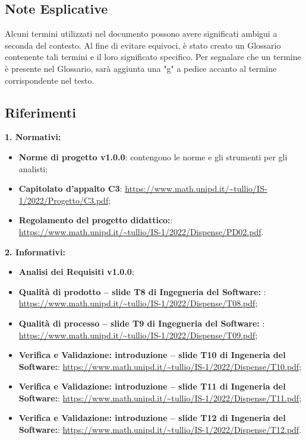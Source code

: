 \subsection{Note Esplicative}
Alcuni termini utilizzati nel documento possono avere significati ambigui a seconda del contesto. Al fine di evitare equivoci, è stato creato un Glossario contenente tali termini 
e il loro significato specifico. Per segnalare che un termine è presente nel Glossario, sarà aggiunta una "g" a pedice accanto al termine corrispondente nel testo.

\subsection{Riferimenti}
\textbf{1. Normativi:} 
\begin{itemize}
    \item \textbf{Norme di progetto v1.0.0}: contengono le norme e gli strumenti per gli analisti;
    \item \textbf{Capitolato d’appalto C3}: \url{https://www.math.unipd.it/~tullio/IS-1/2022/Progetto/C3.pdf};
    \item \textbf{Regolamento del progetto didattico:}: \url{https://www.math.unipd.it/~tullio/IS-1/2022/Dispense/PD02.pdf}.
\end{itemize}

\textbf{2. Informativi:} 
\begin{itemize}
    \item \textbf{Analisi dei Requisiti v1.0.0};
    \item \textbf{Qualità di prodotto – slide T8 di Ingegneria del Software: }: \url{https://www.math.unipd.it/~tullio/IS-1/2022/Dispense/T08.pdf};
    \item \textbf{Qualità di processo – slide T9 di Ingegneria del Software: }: \url{https://www.math.unipd.it/~tullio/IS-1/2022/Dispense/T09.pdf};
    \item \textbf{Verifica e Validazione: introduzione – slide T10 di Ingeneria del Software:}: \url{https://www.math.unipd.it/~tullio/IS-1/2022/Dispense/T10.pdf};
    \item \textbf{Verifica e Validazione: introduzione – slide T11 di Ingeneria del Software:}: \url{https://www.math.unipd.it/~tullio/IS-1/2022/Dispense/T11.pdf};
    \item \textbf{Verifica e Validazione: introduzione – slide T12 di Ingeneria del Software:}: \url{https://www.math.unipd.it/~tullio/IS-1/2022/Dispense/T12.pdf}.

\end{itemize}

